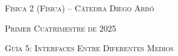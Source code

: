 \documentclass[11pt,spanish]{article}
\begin{document}
    \begin{center}
   \textsc{\large Física 2 (Física) -- Cátedra Diego Arbó}
    \par\end{center}{\large \par}
    
    \begin{center}
    \textsc{\large Primer Cuatrimestre de 2025}
    \par\end{center}{\large \par}
    
    \begin{center}
    \textsc{\large Guía 5: Interfaces Entre Diferentes Medios}
    \par\end{center}{\large \par}
\end{document}
